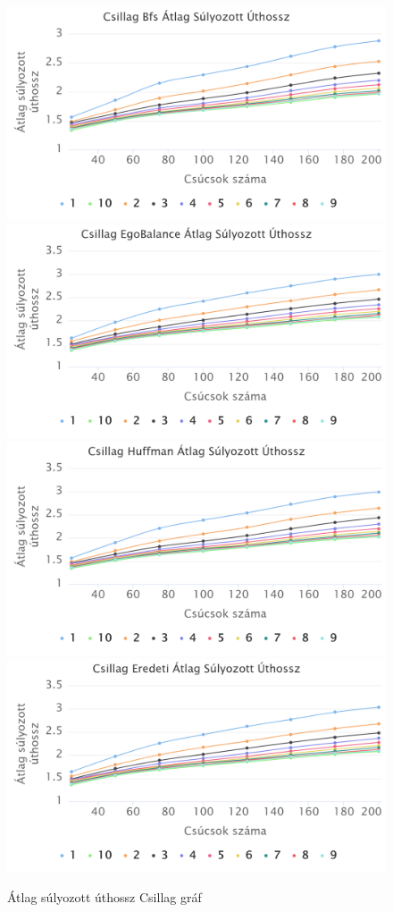 \documentclass[12pt]{report}
\begin{document}
\begin{figure}[h]
	\begin{center}
		\includegraphics[width=0.49\linewidth]{pictures/star_avg_len_bfs.png}
		\includegraphics[width=0.49\linewidth]{pictures/star_avg_len_egobalance.png}
		\includegraphics[width=0.49\linewidth]{pictures/star_avg_len_huffman.png}
		\includegraphics[width=0.49\linewidth]{pictures/star_avg_len_original.png}
		\caption{Átlag súlyozott úthossz Csillag gráf}
	\end{center}
\end{figure}
\end{document}
